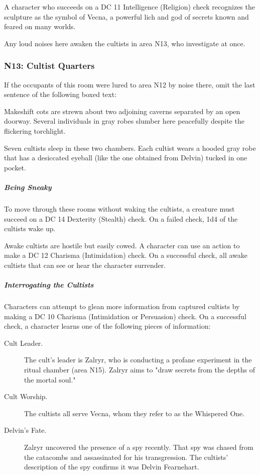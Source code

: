 \documentclass[10pt,a4paper,twoside,fancy,bg=print,twocolumn,openany,nodeprecatedcode]{dndbook}
\begin{document}
A character who succeeds on a DC 11 Intelligence (Religion) check recognizes the sculpture as the symbol of Vecna, a powerful lich and god of secrets known and feared on many worlds.

Any loud noises here awaken the cultists in area N13, who investigate at once.

\subsubsection{N13: Cultist Quarters}
If the occupants of this room were lured to area N12 by noise there, omit the last sentence of the following boxed text:

\begin{DndReadAloud}{}
Makeshift cots are strewn about two adjoining caverns separated by an open doorway. Several individuals in gray robes slumber here peacefully despite the flickering torchlight.

\end{DndReadAloud}

Seven cultists sleep in these two chambers. Each cultist wears a hooded gray robe that has a desiccated eyeball (like the one obtained from Delvin) tucked in one pocket.

\subparagraph{Being Sneaky}
To move through these rooms without waking the cultists, a creature must succeed on a DC 14 Dexterity (Stealth) check. On a failed check, 1d4 of the cultists wake up.

Awake cultists are hostile but easily cowed. A character can use an action to make a DC 12 Charisma (Intimidation) check. On a successful check, all awake cultists that can see or hear the character surrender.

\subparagraph{Interrogating the Cultists}
Characters can attempt to glean more information from captured cultists by making a DC 10 Charisma (Intimidation or Persuasion) check. On a successful check, a character learns one of the following pieces of information:


\begin{description}
\item[Cult Leader.]
The cult's leader is Zalryr, who is conducting a profane experiment in the ritual chamber (area N15). Zalryr aims to "draw secrets from the depths of the mortal soul."
\item[Cult Worship.]
The cultists all serve Vecna, whom they refer to as the Whispered One.
\item[Delvin's Fate.]
Zalryr uncovered the presence of a spy recently. That spy was chased from the catacombs and assassinated for his transgression. The cultists' description of the spy confirms it was Delvin Fearnehart.
\end{description}
\end{document}
